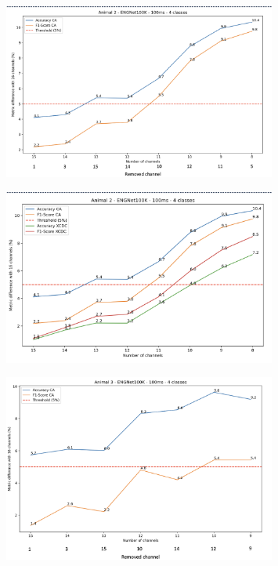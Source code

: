 \documentclass{Configuration_Files/PoliMi3i_thesis}
\begin{document}
\begin{figure}[H]
    \centering
    \includegraphics[width=0.8\textwidth]{Results Matteo/figure13}
    \label{fig:figure1}
\end{figure}

\begin{figure}[H]
    \centering
    \includegraphics[width=0.8\textwidth]{Results Matteo/figure14}
    \label{fig:figure1}
\end{figure}

\begin{figure}[H]
    \centering
    \includegraphics[width=0.8\textwidth]{Results Matteo/figure15}
    \label{fig:figure1}
\end{figure}
\end{document}
